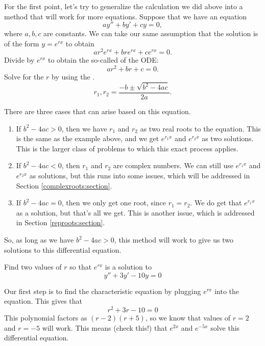 \documentclass{ximera}
\begin{document}
For the first point, let's try to generalize the calculation we did above into a method that will work for more equations. Suppose that we have an equation
\begin{equation} \label{ccsol:eq}
    a y'' + b y' + c y = 0 ,
\end{equation}
where $a, b, c$ are constants. We can take our same assumption that the solution is of the form $y = e^{rx}$ to obtain
\begin{equation*}
    a r^2 e^{rx} +  b r e^{rx} +  c e^{rx} = 0 .
\end{equation*}
Divide by $e^{rx}$ to obtain the so-called \emph{} of the ODE:
\begin{equation*}
    a r^2 +  b r +  c = 0 .
\end{equation*}
Solve for the $r$ by using the .
\begin{equation*}
    r_1, r_2 = \frac{-b \pm \sqrt{b^2 - 4ac}}{2a} .
\end{equation*}

There are three cases that can arise based on this equation.
\begin{enumerate}
    \item If $b^2 - 4ac > 0$, then we have $r_1$ and $r_2$ as two real roots to the equation. This is the same as the example above, and we get $e^{r_1x}$ and $e^{r_2x}$ as two solutions. This is the larger class of problems to which this exact process applies.
    \item If $b^2 - 4ac < 0$, then $r_1$ and $r_2$ are complex numbers. We can still use $e^{r_1x}$ and $e^{r_2x}$ as solutions, but this runs into some issues, which will be addressed in Section \ref{complexroots:section}.
    \item If $b^2 - 4ac = 0$, then we only get one root, since $r_1 = r_2$. We do get that $e^{r_1x}$ as a solution, but that's all we get. This is another issue, which is addressed in Section \ref{reproots:section}.
\end{enumerate}

So, as long as we have $b^2 - 4ac > 0$, this method will work to give us two solutions to this differential equation.

\begin{example}
    Find two values of $r$ so that $e^{rx}$ is a solution to 
    \begin{equation*}
        y'' + 3y' - 10y = 0
    \end{equation*}
    
    Our first step is to find the characteristic equation by plugging $e^{rx}$ into the equation. This gives that
    \begin{equation*}
        r^2 + 3r - 10 = 0
    \end{equation*}
    This polynomial factors as $(r-2)(r+5)$, so we know that values of $r=2$ and $r=-5$ will work. This means (check this!) that $e^{2x}$ and $e^{-5x}$ solve this differential equation.
\end{example}
\end{document}
